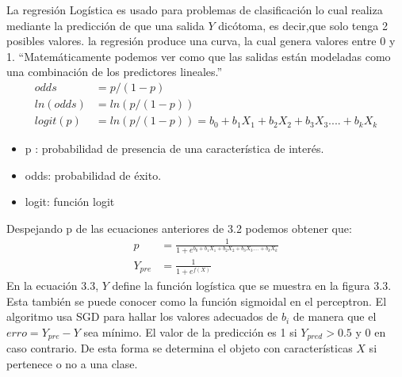  La regresión Logística es usado para problemas de clasificación lo cual realiza mediante la predicción de que una salida $Y$ dicótoma, es decir,que solo tenga 2 posibles valores.
 la regresión produce una curva, la cual genera valores entre 0 y 1.
 \textquotedblleft Matemáticamente podemos ver como que las salidas están modeladas como una combinación de los predictores lineales.\textquotedblright \cite{WEBSITE:6}
 \begin{equation}
 \label{eq:t}
 \begin{aligned}
 odds &= p/ (1-p)\\ 
 ln(odds) &= ln(p/(1-p))\\      
 logit(p) &= ln(p/(1-p)) = b_{0}+b_{1}X_{1}+b_{2}X_{2}+b_{3}X_{3}....+b_{k}X_{k}
 \end{aligned}
 \end{equation}
 
 \begin{itemize}
 	\item p : probabilidad de presencia de una característica de interés.
 	\item odds: probabilidad de éxito.
 	\item logit: función logit
 \end{itemize}
 
 Despejando p de las ecuaciones anteriores de 3.2 podemos obtener que:
  \begin{equation}
  \label{eq:t1}
  \begin{aligned}
  p&=\frac{1}{1+e^{b_{0}+b_{1}X_{1}+b_{2}X_{2}+b_{3}X_{3}....+b_{k}X_{k}}} \\
  Y_{pre}&=\frac{1}{1+e^{f(X)}}
  \end{aligned}
  \end{equation}
 En la ecuación 3.3, $Y$ define la función logística que se muestra en la figura 3.3. Esta también se puede conocer como la función sigmoidal en el perceptron.
 El algoritmo usa SGD para hallar los valores adecuados de $b_{i}$ de manera que el $erro=Y_{pre}- Y$ sea mínimo.
 El valor de la predicción es 1 si $Y_{pred}>0.5$ y 0 en caso contrario. De esta forma se determina el objeto con características $X$ si pertenece o no a una clase.
 
